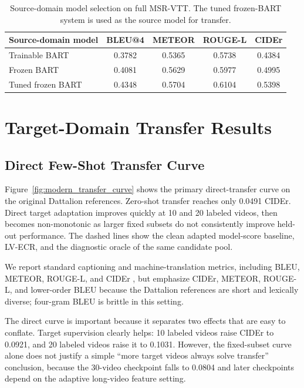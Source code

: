 \documentclass[pdflatex,sn-mathphys-num]{sn-jnl}
\theoremstyle{thmstyleone}
\theoremstyle{thmstyletwo}
\theoremstyle{thmstylethree}
\begin{document}
\begin{table}[htbp]
    \centering
    \begin{tabular}{lcccc}
        \toprule
        \textbf{Source-domain model} & \textbf{BLEU@4} & \textbf{METEOR} & \textbf{ROUGE-L} & \textbf{CIDEr} \\
        \midrule
        Trainable BART & 0.3782 & 0.5365 & 0.5738 & 0.4384 \\
        Frozen BART & 0.4081 & 0.5629 & 0.5977 & 0.4995 \\
        Tuned frozen BART & 0.4348 & 0.5704 & 0.6104 & 0.5398 \\
        \bottomrule
    \end{tabular}
    \caption{Source-domain model selection on full MSR-VTT. The tuned frozen-BART system is used as the source model for transfer.}
    \label{tab:source_models}
\end{table}

\section{Target-Domain Transfer Results}\label{sec6}
\subsection{Direct Few-Shot Transfer Curve}
Figure~\ref{fig:modern_transfer_curve} shows the primary direct-transfer curve on the original Dattalion references. Zero-shot transfer reaches only 0.0491 CIDEr. Direct target adaptation improves quickly at 10 and 20 labeled videos, then becomes non-monotonic as larger fixed subsets do not consistently improve held-out performance. The dashed lines show the clean adapted model-score baseline, LV-ECR, and the diagnostic oracle of the same candidate pool.

We report standard captioning and machine-translation metrics, including BLEU, METEOR, ROUGE-L, and CIDEr \cite{papineni2001bleu,banerjee2005meteor,lin2004rouge,vedantam2015cider}, but emphasize CIDEr, METEOR, ROUGE-L, and lower-order BLEU because the Dattalion references are short and lexically diverse; four-gram BLEU is brittle in this setting.

The direct curve is important because it separates two effects that are easy to conflate. Target supervision clearly helps: 10 labeled videos raise CIDEr to 0.0921, and 20 labeled videos raise it to 0.1031. However, the fixed-subset curve alone does not justify a simple ``more target videos always solve transfer'' conclusion, because the 30-video checkpoint falls to 0.0804 and later checkpoints depend on the adaptive long-video feature setting.
\end{document}
